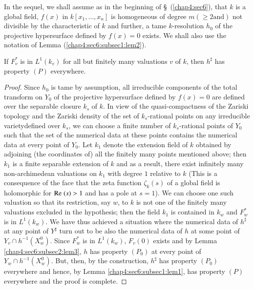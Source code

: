 In the sequel, we shall assume as in the beginning of
\S\ (\ref{chap4:sec6}), that $k$ is a global field, $f(x)$ in
$k[x_{1},\ldots,x_{n}]$ is homogeneous of degree $m(\geq 2 \text{
  and})$ not divisible by the characteristic of $k$ and further, a
tame $k$-resolution $h_{0}$ of the projective hypersurface defined by
$f(x)=0$ exists. We shall also use the notation of Lemma
(\ref{chap4:sec6:subsec1:lem2}).

\begin{lemma}\label{chap4:sec6:subsec2:lem4} %
  If $F^{\ast}_{v}$ is in $L^{1}(k_{v})$ for all but finitely many
  valuations $v$ of $k$, then $h^{\sharp}$ has property $(P)$ everywhere.
\end{lemma}

\begin{proof}
  Since $h_{0}$ is tame by assumption, all irreducible components of the
  total transform on $Y_{0}$ of the projective hypersurface defined by\break
  $f(x)=0$ are defined over the separable closure $k_{s}$ of $k$. In
  view of the quasi-compactness of the Zariski topology and the Zariski
  density of the set of $k_{s}$-rational points on any irreducible
  variety\pageoriginale defined over $k_{s}$, we can choose a finite
  number of $k_{s}$-rational points of $Y_{0}$ such that the set of the
  numerical data at these points contains the numerical data at every
  point of $Y_{0}$. Let $k_{1}$ denote the extension field of $k$
  obtained by adjoining (the coordinates of) all the finitely many
  points mentioned above; then $k_{1}$ is a finite separable extension
  of $k$ and as a result, there exist infinitely many non-archimedean
  valuations on $k_{1}$ with degree $1$ relative to $k$ (This is a
  consequence of the face that the zeta function $\zeta_{k}(s)$ of a
  global field is holomorphic for $\text{Re\;}(s)>1$ and has a pole at
  $s=1$). We can choose one such valuation so that its restriction, say
  $w$, to $k$ is not one of the finitely many valuations excluded in the
  hypothesis; then the field $k_{1}$ is contained in $k_{w}$ and
  $F^{\ast}_{w}$ is in $L^{1}(k_{w})$. We have thus achieved a situation
  where the numerical data of $h^{\sharp}$ at any point of $Y^{\sharp}$
  turn out to be also the numerical data of $h$ at some point of
  $Y_{v}\cap h^{-1}(X^{0}_{w})$. Since $F^{\ast}_{w}$ is in
  $L^{1}(k_{w})$, $F_{v}(0)$ exists and by Lemma
   \ref{chap4:sec6:subsec2:lem3}, $h$ has
  property $(P_{0})$ at every point of $Y_{w}\cap
  h^{-1}(X^{0}_{w})$. But, then, by the construction, $h^{\sharp}$ has
  property $(P_{0})$ everywhere and hence, by Lemma
  \ref{chap4:sec6:subsec1:lem1}, has 
  property $(P)$ everywhere and the proof is complete.
\end{proof}

